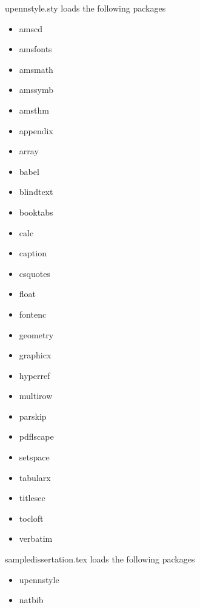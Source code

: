 
upennstyle.sty loads the following packages
\begin{itemize}
\item amscd
\item amsfonts
\item amsmath
\item amssymb
\item amsthm
\item appendix
\item array
\item babel
\item blindtext
\item booktabs
\item calc
\item caption
\item csquotes
\item float
\item fontenc
\item geometry 
\item graphicx
\item hyperref
\item multirow
\item parskip
\item pdflscape
\item setspace
\item tabularx
\item titlesec
\item tocloft
\item verbatim
\end{itemize}

sampledissertation.tex loads the following packages
\begin{itemize}
\item upennstyle
\item natbib
\end{itemize}